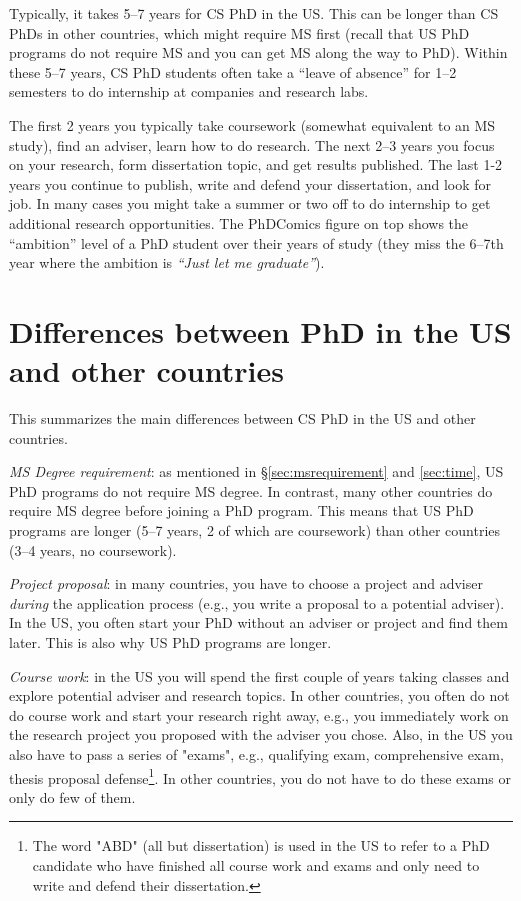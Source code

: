\documentclass[oneside,11pt]{memoir}
\begin{document}
    Typically, it takes 5--7 years for CS PhD in the US.  This can be longer than CS PhDs in other countries, which might require MS first (recall that US PhD programs do not require MS and you can get MS along the way to PhD). Within these 5--7 years, CS PhD students often take a ``leave of absence'' for 1--2 semesters to do internship at companies and research labs. 
    
    The first 2 years you typically take coursework (somewhat equivalent to an MS study), find an adviser, learn how to do research.  The next 2--3 years you focus on your research, form dissertation topic, and get results published. The last 1-2 years you continue to publish, write and defend your dissertation, and look for job. 
    In many cases you might take a summer or two off to do internship to get additional research opportunities.
    The PhDComics figure on top shows the ``ambition'' level of a PhD student over their years of study (they miss the 6--7th year where the ambition is \emph{``Just let me graduate''}).


\section{Differences between PhD in the US and other countries}\label{sec:non-us-differences}
This summarizes the main differences between CS PhD in the US and other countries. %

\emph{MS Degree requirement}:  as mentioned in \S\ref{sec:msrequirement} and \ref{sec:time}, US PhD programs do not require MS degree.  In contrast, many other countries do require MS degree before joining a PhD program.  This means that US PhD programs are longer (5--7 years, 2 of which are coursework) than other countries (3--4 years, no coursework).  

\emph{Project proposal}: in many countries, you have to choose a project and adviser \emph{during} the application process (e.g., you write a proposal to a potential adviser). In the US, you often start your PhD without an adviser or project and find them later. This is also why US PhD programs are longer.

\emph{Course work}: in the US you will spend the first couple of years taking classes and explore potential adviser and research topics. In other countries, you often do not do course work and start your research right away, e.g., you immediately work on the research project you proposed with the adviser you chose. Also, in the US you also have to pass a series of "exams", e.g., qualifying exam, comprehensive exam, thesis proposal defense\footnote{The word "ABD" (all but dissertation) is used in the US to refer to a PhD candidate who have finished all course work and exams and only need to write and defend their dissertation.}. In other countries, you do not have to do these exams or only do few of them.
\end{document}
